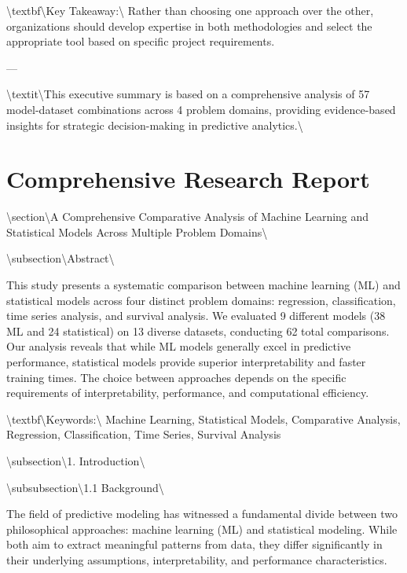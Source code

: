 \documentclass[11pt,a4paper]{article}
\begin{document}
\textbackslash{}textbf\textbackslash{}{Key Takeaway:\textbackslash{}} Rather than choosing one approach over the other, organizations should develop expertise in both methodologies and select the appropriate tool based on specific project requirements.

---

\textbackslash{}textit\textbackslash{}{This executive summary is based on a comprehensive analysis of 57 model-dataset combinations across 4 problem domains, providing evidence-based insights for strategic decision-making in predictive analytics.\textbackslash{}}


\newpage
\section{Comprehensive Research Report}
\textbackslash{}section\textbackslash{}{A Comprehensive Comparative Analysis of Machine Learning and Statistical Models Across Multiple Problem Domains\textbackslash{}}

\textbackslash{}subsection\textbackslash{}{Abstract\textbackslash{}}

This study presents a systematic comparison between machine learning (ML) and statistical models across four distinct problem domains: regression, classification, time series analysis, and survival analysis. We evaluated 9 different models (38 ML and 24 statistical) on 13 diverse datasets, conducting 62 total comparisons. Our analysis reveals that while ML models generally excel in predictive performance, statistical models provide superior interpretability and faster training times. The choice between approaches depends on the specific requirements of interpretability, performance, and computational efficiency.

\textbackslash{}textbf\textbackslash{}{Keywords:\textbackslash{}} Machine Learning, Statistical Models, Comparative Analysis, Regression, Classification, Time Series, Survival Analysis

\textbackslash{}subsection\textbackslash{}{1. Introduction\textbackslash{}}

\textbackslash{}subsubsection\textbackslash{}{1.1 Background\textbackslash{}}

The field of predictive modeling has witnessed a fundamental divide between two philosophical approaches: machine learning (ML) and statistical modeling. While both aim to extract meaningful patterns from data, they differ significantly in their underlying assumptions, interpretability, and performance characteristics.
\end{document}
